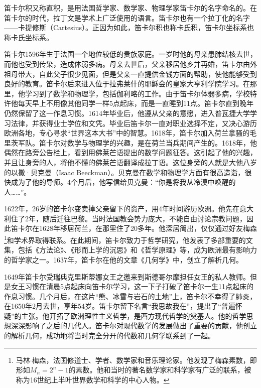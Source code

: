 \documentclass[b5paper]{ctexart}
\begin{document}
 
笛卡尔积又称直积，是用法国哲学家、数学家、物理学家笛卡尔的名字命名的。在笛卡尔的时代，拉丁文是学术上广泛使用的语言。笛卡尔也有一个拉丁化的名字——卡提修斯（Cartesius）。正因为如此，笛卡尔积也称卡氏积，笛卡尔坐标系也称卡氏坐标系。

笛卡尔1596年生于法国一个地位较低的贵族家庭。一岁时他的母亲患肺结核去世，而他也受到传染，造成体弱多病。母亲去世后，父亲移居他乡并再婚，笛卡尔由外祖母带大，自此父子很少见面，但是父亲一直提供金钱方面的帮助，使他能够受到良好的教育。笛卡尔后来进入位于拉弗莱什的耶稣会的皇家大亨利学院学习。在那里，他学习到了数学和物理学，包括伽利略的工作。由于笛卡尔体弱多病，学校特许他每天早上不用像其他同学一样5点起床，而是一直睡到11点。笛卡尔直到晚年仍然保留了这一作息习惯。1614年毕业后，他遵从父亲的意愿，进入普瓦捷大学学习法律，并获得业士学位和文凭。毕业后笛卡尔一直对职业选择不定，又决心游历欧洲各地，专心寻求“世界这本大书”中的智慧。1618年，笛卡尔加入荷兰拿骚的毛里茨军队。笛卡尔对数学与物理学的兴趣，是在荷兰当兵期间产生的。1618年，他偶然在路旁公告栏上，看到用佛莱芒语提出的数学问题征答。这引起了他的兴趣，并且让身旁的人，将他不懂的佛莱芒语翻译成拉丁语。这位身旁的人就是大他八岁的以撒·贝克曼（Isaac Beeckman）。贝克曼在数学和物理学方面有很高造诣，很快成为了他的导师。4个月后，他写信给贝克曼：“你是将我从冷漠中唤醒的人……”。

1622年，26岁的笛卡尔变卖掉父亲留下的资产，用4年时间游历欧洲。他先在意大利住了2年，随后迁往巴黎。当时法国教会势力庞大，不能自由讨论宗教问题，因此笛卡尔在1628年移居荷兰，在那里住了20多年。他深居简出，仅仅通过好友梅森\footnote{马林$\cdot$梅森，法国修道士、学者、数学家和音乐理论家。他发现了梅森素数，即形如$M_n = 2^n − 1$的素数。他和当时的著名数学家和科学家有广泛的联系，被称为16世纪上半叶世界数学和科学的中心人物。}和学术界取得联系。在此期间，笛卡尔致力于哲学研究，他发表了多部重要的文集，包括《方法论》、《形而上学的沉思》和《哲学原理》等，成为欧洲最有影响力的哲学家之一。1637年，笛卡尔在他的文章《几何学》中，创立了解析几何。

1649年笛卡尔受瑞典克里斯蒂娜女王之邀来到斯德哥尔摩担任女王的私人教师。但是女王习惯在清晨5点起床向笛卡尔学习，这一下子打破了笛卡尔一生11点起床的作息习惯。几个月后，在这片“熊、冰雪与岩石的土地”上，笛卡尔不幸得了肺炎，在1650年2月去世，享年54岁。笛卡尔留下名言“我思故我在”，提出了“普遍怀疑”的主张。他开拓了欧洲理性主义哲学，是西方现代哲学的奠基人。他的哲学思想深深影响了之后的几代人。笛卡尔对现代数学的发展做出了重要的贡献，他创立的解析几何，成功地将当时完全分开的代数和几何学联系到了一起。

\vspace{5mm}
\end{document}
